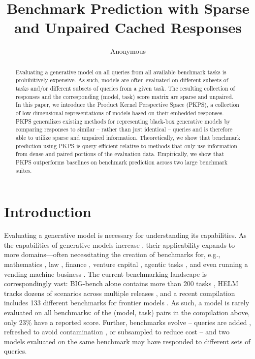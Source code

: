 \documentclass{article}
\title{Benchmark Prediction with Sparse and Unpaired Cached Responses}
\author{Anonymous}
\theoremstyle{definition}
\theoremstyle{remark}
\theoremstyle{plain}
\newcommand{\PKPS}{PKPS\xspace}
\begin{document}
\maketitle

\begin{abstract}
Evaluating a generative model on all queries from all available benchmark tasks is
prohibitively expensive. As such, models are often evaluated on different subsets of tasks
and/or different subsets of queries from a given task. The resulting collection of
responses and the corresponding (model, task) score matrix are sparse and unpaired. In
this paper, we introduce the Product Kernel Perspective Space (\PKPS), a collection of
low-dimensional representations of models based on their embedded responses. \PKPS
generalizes existing methods for representing black-box generative models by comparing responses to similar -- rather than just
identical -- queries and is therefore able to utilize sparse and unpaired information. Theoretically, we show that
benchmark prediction using \PKPS is query-efficient relative to methods that only use information from dense and paired portions of the evaluation data. 
Empirically, we show that \PKPS
outperforms baselines on benchmark prediction across two large benchmark suites.
\end{abstract}

\section{Introduction}
\label{sec:introduction}
Evaluating a generative model is necessary for understanding its capabilities.
As the capabilities of generative models increase \citep{wei2022emergent, bubeck2023sparks},
their applicability expands to more domains---often necessitating the creation of benchmarks for, e.g., mathematics \citep{hendrycks2021math}, law
\citep{guha2023legalbench}, finance \citep{islam2023financebench}, venture capital
\citep{chen2025vcbench}, agentic tasks \citep{liu2023agentbench}, and even running a
vending machine business \citep{backlund2025vendingbench}.
The current benchmarking landscape is correspondingly vast: BIG-bench alone contains
more than 200 tasks \citep{srivastava2023beyond}, HELM tracks dozens of scenarios
across multiple releases \citep{helm}, and a recent compilation includes 133 different
benchmarks for frontier models \citep{benchpress}.
As such, a model is rarely evaluated on all benchmarks: of the (model, task) pairs in
the compilation above, only 23\% have a reported score.
Further, benchmarks evolve -- queries are added \citep{chollet2025arcagi2}, refreshed to avoid contamination
\citep{white2024livebench}, or subsampled to reduce cost
\citep{perlitz2024efficient} -- and two models evaluated on the same benchmark may have responded to different sets of queries.
\end{document}
